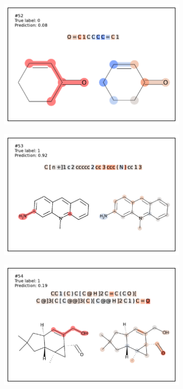 \begin{figure}
\begin{subfigure}[b]{0.33\textwidth}
\end{subfigure}\begin{subfigure}[b]{0.33\textwidth} 
  \centering 
  \includegraphics[width=\textwidth]{figures/ames/ames52.pdf} 
\end{subfigure} 
\begin{subfigure}[b]{0.33\textwidth} 
  \centering 
  \includegraphics[width=\textwidth]{figures/ames/ames53.pdf} 
\end{subfigure}\begin{subfigure}[b]{0.33\textwidth} 
  \centering 
  \includegraphics[width=\textwidth]{figures/ames/ames54.pdf} 

\end{subfigure}
\end{figure}
